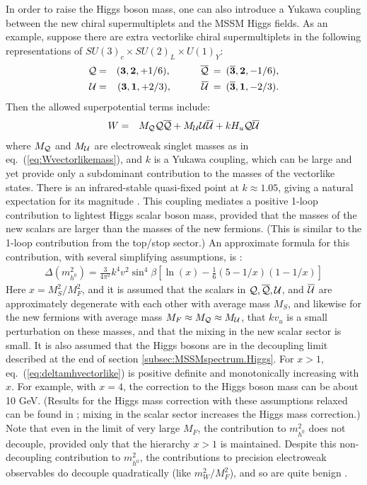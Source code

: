 \documentclass[12pt]{article}
\def\beq{\begin{eqnarray}}
\def\eeq{\end{eqnarray}}
\begin{document}
In order to raise the Higgs boson mass, one can also introduce a Yukawa 
coupling between the new chiral supermultiplets 
and the MSSM Higgs fields. As an example, suppose 
there are extra vectorlike chiral supermultiplets in the following 
representations of $SU(3)_c \times SU(2)_L \times U(1)_Y$:
\beq
{\cal Q} &=& ({\bf 3}, {\bf 2}, +1/6),\qquad\quad
\overline{\cal Q} \>=\> ({\bf \overline{3}}, {\bf 2}, -1/6),
\\
{\cal U} &=& ({\bf 3}, {\bf 1}, +2/3),\qquad\quad
\overline{\cal U} \>=\> ({\bf \overline{3}}, {\bf 1}, -2/3).
\eeq
Then the allowed superpotential terms include:
\beq
W &=& M_{\cal Q} {\cal Q}\overline{\cal Q} + 
M_{\cal U} {\cal U}\overline{\cal U}
+ k H_u {\cal Q}\overline{\cal U}
\eeq
where $M_{\cal Q}$ and $M_{\cal U}$ are electroweak singlet masses 
as in eq.~(\ref{eq:Wvectorlikemass}), and $k$ is a Yukawa 
coupling, which can be large and yet provide only a subdominant contribution to the
masses of the vectorlike states. There is an infrared-stable 
quasi-fixed point at $k\approx 1.05$, giving a natural expectation for its magnitude
\cite{Martin:2009bg}. 
This coupling mediates a positive 1-loop contribution to 
lightest Higgs scalar boson mass, provided that 
the masses of the new scalars are larger than the masses of the new fermions.
(This is similar to the 1-loop contribution from the top/stop sector.)   
An approximate formula for this contribution, 
with several simplifying assumptions, is \cite{Babu:2008ge}:
\beq
\Delta (m_{h^0}^2) = \frac{3}{4 \pi^2} k^4 v^2 \sin^4\beta \left [
\ln(x) - \frac{1}{6} (5-1/x)(1-1/x) \right ]
\label{eq:deltamhvectorlike}
\eeq
Here $x = M_S^2/M_F^2$, and it is assumed 
that the scalars in ${\cal Q}, \overline{\cal Q},
{\cal U}$, and $\overline{\cal U}$ are approximately degenerate with 
each other with average mass $M_S$, and likewise for the new fermions with 
average mass $M_F \approx M_{\cal Q} \approx M_{\cal U} $, that 
$k v_u$ is a small perturbation on these masses,
and that the mixing in the new scalar sector is small. 
It is also assumed that the Higgs bosons are in 
the decoupling limit described at the end of section
\ref{subsec:MSSMspectrum.Higgs}. For $x>1$, 
eq.~(\ref{eq:deltamhvectorlike}) is positive definite 
and monotonically increasing with $x$. For example, with $x=4$, the correction 
to the Higgs boson mass can be about 10 GeV. (Results for the Higgs mass 
correction with these assumptions relaxed can be found in \cite{Martin:2009bg}; mixing in the scalar sector increases the Higgs mass correction.)
Note that even in the limit of very large $M_F$, the contribution to $m_{h^0}^2$
does not decouple, provided only that the hierarchy $x>1$ is maintained. Despite 
this non-decoupling contribution to $m_{h^0}^2$, the contributions to 
precision electroweak observables do decouple quadratically (like $m_W^2/M_F^2$), and so are quite benign \cite{Martin:2009bg}.
\end{document}
